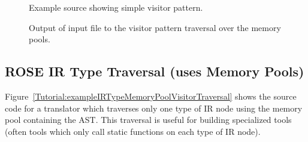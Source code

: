 \begin{figure}[!h]
{\indent
{\mySmallFontSize


\begin{latexonly}
   
\end{latexonly}

\begin{htmlonly}
   
\end{htmlonly}

}
}
\caption{Example source showing simple visitor pattern.}
\label{Tutorial:exampleMemoryPoolVisitorPattern}
\end{figure}


\begin{figure}[!h]
{\indent
{\mySmallFontSize

\begin{latexonly}
   
\end{latexonly}

\begin{htmlonly}
   
\end{htmlonly}

}
}
\caption{Output of input file to the visitor pattern traversal over the memory pools.}
\label{Tutorial:exampleOutput_MemoryPoolVisitorPattern}
\end{figure}

\clearpage
\subsection{ROSE IR Type Traversal (uses Memory Pools)}

Figure~\ref{Tutorial:exampleIRTypeMemoryPoolVisitorTraversal} shows the source code 
for a translator which traverses only one type of IR node using the memory pool 
containing the AST.  This traversal is useful for building specialized tools
(often tools which only call static functions on each type of IR node).


